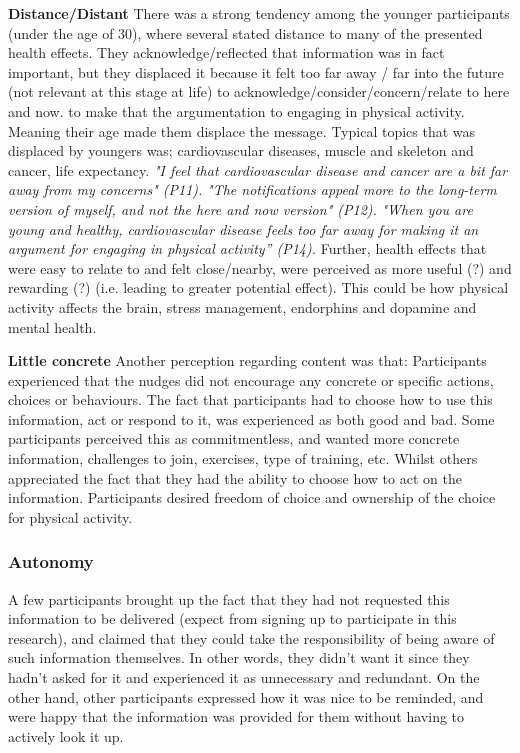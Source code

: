 \textbf{Distance/Distant}
There was a strong tendency among the younger participants (under the age of 30), where several stated distance to many of the presented health effects. They acknowledge/reflected that information was in fact important, but they displaced it because it felt too far away /  far into the future (not relevant at this stage at life) to acknowledge/consider/concern/relate to here and now. to make that the argumentation to engaging in physical activity. Meaning their age made them displace the message. Typical topics that was displaced by youngers was; cardiovascular diseases, muscle and skeleton and cancer, life expectancy. 
\textit{"I feel that cardiovascular disease and cancer are a bit far away from my concerns" (P11).}
\textit{"The notifications appeal more to the long-term version of myself, and not the here and now version" (P12).}
\textit{"When you are young and healthy, cardiovascular disease feels too far away for making it an argument for engaging in physical activity” (P14).} Further, health effects that were easy to relate to and felt close/nearby, were perceived as more useful (?) and rewarding (?) (i.e. leading to greater potential effect). This could be how physical activity affects the brain, stress management, endorphins and dopamine and mental health. 

\textbf{Little concrete}
Another perception regarding content was that: Participants experienced that the nudges did not encourage any concrete or specific actions, choices or behaviours. The fact that participants had to choose how to use this information, act or respond to it, was experienced as both good and bad. Some participants perceived this as commitmentless, and wanted more concrete information, challenges to join, exercises, type of training, etc. Whilst others appreciated the fact that they had the ability to choose how to act on the information. Participants desired freedom of choice and ownership of the choice for physical activity. 

\subsubsection{Autonomy}
A few participants brought up the fact that they had not requested this information to be delivered (expect from signing up  to participate in this research), and claimed that they could take the responsibility of being aware of such information themselves. In other words, they didn't want it since they hadn't asked for it and experienced it as unnecessary and redundant. On the other hand, other participants expressed how it was nice to be reminded, and were happy that the information was provided for them without having to actively look it up. 


